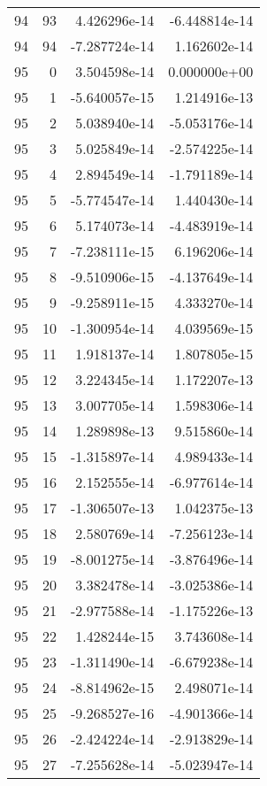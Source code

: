 \begin{tabular}{rrrr}
  94 &   93 &  4.426296e-14 & -6.448814e-14 \\
  94 &   94 & -7.287724e-14 &  1.162602e-14 \\
  95 &    0 &  3.504598e-14 &  0.000000e+00 \\
  95 &    1 & -5.640057e-15 &  1.214916e-13 \\
  95 &    2 &  5.038940e-14 & -5.053176e-14 \\
  95 &    3 &  5.025849e-14 & -2.574225e-14 \\
  95 &    4 &  2.894549e-14 & -1.791189e-14 \\
  95 &    5 & -5.774547e-14 &  1.440430e-14 \\
  95 &    6 &  5.174073e-14 & -4.483919e-14 \\
  95 &    7 & -7.238111e-15 &  6.196206e-14 \\
  95 &    8 & -9.510906e-15 & -4.137649e-14 \\
  95 &    9 & -9.258911e-15 &  4.333270e-14 \\
  95 &   10 & -1.300954e-14 &  4.039569e-15 \\
  95 &   11 &  1.918137e-14 &  1.807805e-15 \\
  95 &   12 &  3.224345e-14 &  1.172207e-13 \\
  95 &   13 &  3.007705e-14 &  1.598306e-14 \\
  95 &   14 &  1.289898e-13 &  9.515860e-14 \\
  95 &   15 & -1.315897e-14 &  4.989433e-14 \\
  95 &   16 &  2.152555e-14 & -6.977614e-14 \\
  95 &   17 & -1.306507e-13 &  1.042375e-13 \\
  95 &   18 &  2.580769e-14 & -7.256123e-14 \\
  95 &   19 & -8.001275e-14 & -3.876496e-14 \\
  95 &   20 &  3.382478e-14 & -3.025386e-14 \\
  95 &   21 & -2.977588e-14 & -1.175226e-13 \\
  95 &   22 &  1.428244e-15 &  3.743608e-14 \\
  95 &   23 & -1.311490e-14 & -6.679238e-14 \\
  95 &   24 & -8.814962e-15 &  2.498071e-14 \\
  95 &   25 & -9.268527e-16 & -4.901366e-14 \\
  95 &   26 & -2.424224e-14 & -2.913829e-14 \\
  95 &   27 & -7.255628e-14 & -5.023947e-14 \\

\end{tabular}
